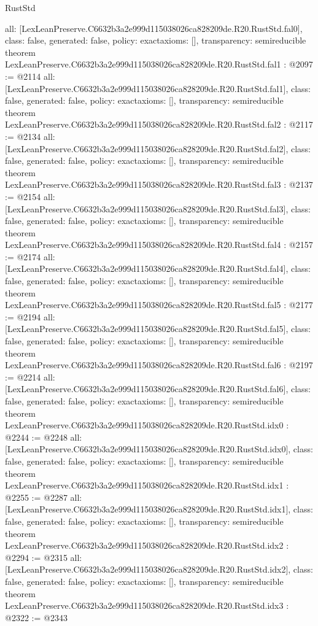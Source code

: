 \begin{lexlean}{RustStd}
\begin{coremodule}
{  all: [LexLeanPreserve.C6632b3a2e999d115038026ca828209de.R20.RustStd.fal0],
  class: false,
  generated: false,
  policy: exact{axioms: []},
  transparency: semireducible
}
theorem LexLeanPreserve.C6632b3a2e999d115038026ca828209de.R20.RustStd.fal1 : @2097 := @2114 {
  all: [LexLeanPreserve.C6632b3a2e999d115038026ca828209de.R20.RustStd.fal1],
  class: false,
  generated: false,
  policy: exact{axioms: []},
  transparency: semireducible
}
theorem LexLeanPreserve.C6632b3a2e999d115038026ca828209de.R20.RustStd.fal2 : @2117 := @2134 {
  all: [LexLeanPreserve.C6632b3a2e999d115038026ca828209de.R20.RustStd.fal2],
  class: false,
  generated: false,
  policy: exact{axioms: []},
  transparency: semireducible
}
theorem LexLeanPreserve.C6632b3a2e999d115038026ca828209de.R20.RustStd.fal3 : @2137 := @2154 {
  all: [LexLeanPreserve.C6632b3a2e999d115038026ca828209de.R20.RustStd.fal3],
  class: false,
  generated: false,
  policy: exact{axioms: []},
  transparency: semireducible
}
theorem LexLeanPreserve.C6632b3a2e999d115038026ca828209de.R20.RustStd.fal4 : @2157 := @2174 {
  all: [LexLeanPreserve.C6632b3a2e999d115038026ca828209de.R20.RustStd.fal4],
  class: false,
  generated: false,
  policy: exact{axioms: []},
  transparency: semireducible
}
theorem LexLeanPreserve.C6632b3a2e999d115038026ca828209de.R20.RustStd.fal5 : @2177 := @2194 {
  all: [LexLeanPreserve.C6632b3a2e999d115038026ca828209de.R20.RustStd.fal5],
  class: false,
  generated: false,
  policy: exact{axioms: []},
  transparency: semireducible
}
theorem LexLeanPreserve.C6632b3a2e999d115038026ca828209de.R20.RustStd.fal6 : @2197 := @2214 {
  all: [LexLeanPreserve.C6632b3a2e999d115038026ca828209de.R20.RustStd.fal6],
  class: false,
  generated: false,
  policy: exact{axioms: []},
  transparency: semireducible
}
theorem LexLeanPreserve.C6632b3a2e999d115038026ca828209de.R20.RustStd.idx0 : @2244 := @2248 {
  all: [LexLeanPreserve.C6632b3a2e999d115038026ca828209de.R20.RustStd.idx0],
  class: false,
  generated: false,
  policy: exact{axioms: []},
  transparency: semireducible
}
theorem LexLeanPreserve.C6632b3a2e999d115038026ca828209de.R20.RustStd.idx1 : @2255 := @2287 {
  all: [LexLeanPreserve.C6632b3a2e999d115038026ca828209de.R20.RustStd.idx1],
  class: false,
  generated: false,
  policy: exact{axioms: []},
  transparency: semireducible
}
theorem LexLeanPreserve.C6632b3a2e999d115038026ca828209de.R20.RustStd.idx2 : @2294 := @2315 {
  all: [LexLeanPreserve.C6632b3a2e999d115038026ca828209de.R20.RustStd.idx2],
  class: false,
  generated: false,
  policy: exact{axioms: []},
  transparency: semireducible
}
theorem LexLeanPreserve.C6632b3a2e999d115038026ca828209de.R20.RustStd.idx3 : @2322 := @2343 {
}
\end{coremodule}
\end{lexlean}

